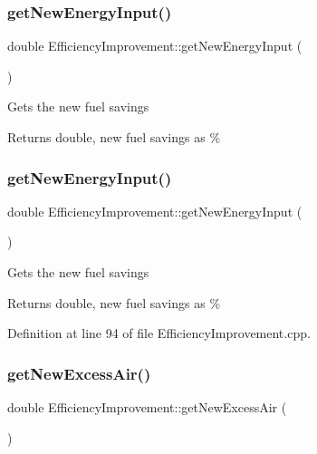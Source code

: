 \subsubsection{\texorpdfstring{get\+New\+Energy\+Input()}{getNewEnergyInput()}\hspace{0.1cm}{\footnotesize\ttfamily [2/3]}}
{\footnotesize\ttfamily double Efficiency\+Improvement\+::get\+New\+Energy\+Input (\begin{DoxyParamCaption}{ }\end{DoxyParamCaption})}

Gets the new fuel savings

\begin{DoxyReturn}{Returns}
double, new fuel savings as \% 
\end{DoxyReturn}
\mbox{\label{class_efficiency_improvement_a3c31caaed812edb8c465b53dc9029810}} 
\subsubsection{\texorpdfstring{get\+New\+Energy\+Input()}{getNewEnergyInput()}\hspace{0.1cm}{\footnotesize\ttfamily [3/3]}}
{\footnotesize\ttfamily double Efficiency\+Improvement\+::get\+New\+Energy\+Input (\begin{DoxyParamCaption}{ }\end{DoxyParamCaption})}

Gets the new fuel savings

\begin{DoxyReturn}{Returns}
double, new fuel savings as \% 
\end{DoxyReturn}


Definition at line 94 of file Efficiency\+Improvement.\+cpp.

\mbox{\label{class_efficiency_improvement_afda194c72ccc7332ba4331f87f971b77}} 
\subsubsection{\texorpdfstring{get\+New\+Excess\+Air()}{getNewExcessAir()}\hspace{0.1cm}{\footnotesize\ttfamily [1/3]}}
{\footnotesize\ttfamily double Efficiency\+Improvement\+::get\+New\+Excess\+Air (\begin{DoxyParamCaption}{ }\end{DoxyParamCaption})}

